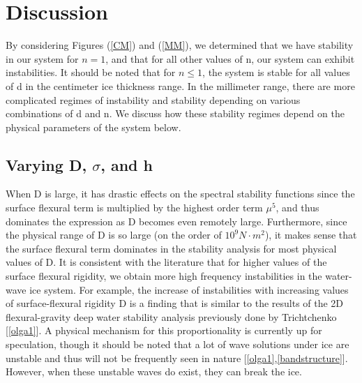 \documentclass{article}
\begin{document}
\clearpage 

\section{Discussion}
By considering Figures (\ref{CM}) and (\ref{MM}), we determined that we have stability in our system for \(n = 1\), and that for all other values of n, our system can exhibit instabilities. It should be noted that for \(n \leq 1\), the system is stable for all values of d in the centimeter ice thickness range. In the millimeter range, there are more complicated regimes of instability and stability depending on various combinations of d and n. We discuss how these stability regimes depend on the physical parameters of the system below.

\subsection{Varying D, \(\sigma\), and h}

When D is large, it has drastic effects on the spectral stability functions since the surface flexural term is multiplied by the highest order term \(\mu ^ 5\), and thus dominates the expression as D becomes even remotely large. Furthermore, since the physical range of D is so large (on the order of \(10^9  N \cdot m^2\)), it makes sense that the surface flexural term dominates in the stability analysis for most physical values of D. It is consistent with the literature that for higher values of the surface flexural rigidity, we obtain more high frequency instabilities in the water-wave ice system. For example, the increase of instabilities with increasing values of surface-flexural rigidity D is a finding that is similar to the results of the 2D flexural-gravity deep water stability analysis previously done by Trichtchenko [\ref{olga1}]. A physical mechanism for this proportionality is currently up for speculation, though it should be noted that a lot of wave solutions under ice are unstable and thus will not be frequently seen in nature [\ref{olga1},\ref{bandstructure}]. However, when these unstable waves do exist, they can break the ice. 
\\
\\
\end{document}
